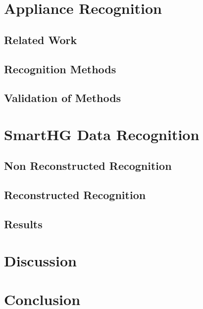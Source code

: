 \chapter{Appliance Recognition }
\section{Related Work} 
\section{Recognition Methods} 
\section{Validation of Methods} 

\chapter{SmartHG Data Recognition} 
\section{Non Reconstructed Recognition }
\section{Reconstructed Recognition }
\section{Results}

\chapter{Discussion}

\chapter{Conclusion}
\begingroup
	\raggedright
	
\endgroup



